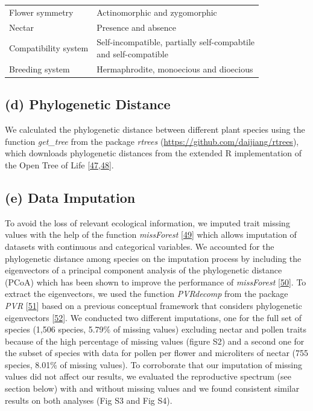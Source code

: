 \documentclass[
  12pt,
  a4paper,
]{article}
\begin{document}
\begin{table}
\begin{tabular}[t]{ll}
\hspace{1em}Flower symmetry & Actinomorphic and zygomorphic\\
\hspace{1em}Nectar & Presence and absence\\
\hspace{1em}Compatibility system & \makecell[l]{Self-incompatible, partially self-compabtile \\ and self-compatible}\\
\hspace{1em}Breeding system & Hermaphrodite, monoecious and dioecious\\
\bottomrule
\end{tabular}
\end{table}

\doublespacing

\hypertarget{d-phylogenetic-distance}{%
\subsection{(d) Phylogenetic Distance}\label{d-phylogenetic-distance}}

We calculated the phylogenetic distance between different plant species using the function \emph{get\_tree} from the package \emph{rtrees} (\url{https://github.com/daijiang/rtrees}), which downloads phylogenetic distances from the extended R implementation of the Open Tree of Life {[}\protect\hyperlink{ref-smith2018}{47},\protect\hyperlink{ref-jin2019}{48}{]}.

\hypertarget{e-data-imputation}{%
\subsection{(e) Data Imputation}\label{e-data-imputation}}

To avoid the loss of relevant ecological information, we imputed trait missing values with the help of the function \emph{missForest} {[}\protect\hyperlink{ref-stekhoven2012}{49}{]} which allows imputation of datasets with continuous and categorical variables. We accounted for the phylogenetic distance among species on the imputation process by including the eigenvectors of a principal component analysis of the phylogenetic distance (PCoA) which has been shown to improve the performance of \emph{missForest} {[}\protect\hyperlink{ref-penone2014}{50}{]}. To extract the eigenvectors, we used the function \emph{PVRdecomp} from the package \emph{PVR} {[}\protect\hyperlink{ref-santos2018}{51}{]} based on a previous conceptual framework that considers phylogenetic eigenvectors {[}\protect\hyperlink{ref-diniz-filho2012}{52}{]}. We conducted two different imputations, one for the full set of species (1,506 species, 5.79\% of missing values) excluding nectar and pollen traits because of the high percentage of missing values (figure S2) and a second one for the subset of species with data for pollen per flower and microliters of nectar (755 species, 8.01\% of missing values). To corroborate that our imputation of missing values did not affect our results, we evaluated the reproductive spectrum (see section below) with and without missing values and we found consistent similar results on both analyses (Fig S3 and Fig S4).
\end{document}
